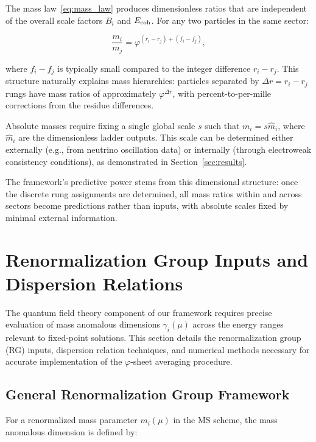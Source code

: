 \documentclass[%
amsmath,amssymb,
aps,
prb,
floatfix,
twocolumn
]{revtex4-2}
\begin{document}
The mass law~\eqref{eq:mass_law} produces dimensionless ratios that are independent of the overall scale factors $B_i$ and $E_{\rm coh}$. For any two particles in the same sector:

\begin{equation}
\frac{m_i}{m_j} = \varphi^{(r_i - r_j) + (f_i - f_j)},
\label{eq:mass_ratio}
\end{equation}

where $f_i - f_j$ is typically small compared to the integer difference $r_i - r_j$. This structure naturally explains mass hierarchies: particles separated by $\Delta r = r_i - r_j$ rungs have mass ratios of approximately $\varphi^{\Delta r}$, with percent-to-per-mille corrections from the residue differences.

Absolute masses require fixing a single global scale $s$ such that $m_i = s \hat{m}_i$, where $\hat{m}_i$ are the dimensionless ladder outputs. This scale can be determined either externally (e.g., from neutrino oscillation data) or internally (through electroweak consistency conditions), as demonstrated in Section~\ref{sec:results}.

The framework's predictive power stems from this dimensional structure: once the discrete rung assignments are determined, all mass ratios within and across sectors become predictions rather than inputs, with absolute scales fixed by minimal external information.

\section{Renormalization Group Inputs and Dispersion Relations}
\label{sec:running}

The quantum field theory component of our framework requires precise evaluation of mass anomalous dimensions $\gamma_i(\mu)$ across the energy ranges relevant to fixed-point solutions. This section details the renormalization group (RG) inputs, dispersion relation techniques, and numerical methods necessary for accurate implementation of the $\varphi$-sheet averaging procedure.

\subsection{General Renormalization Group Framework}
\label{subsec:rg_framework}

For a renormalized mass parameter $m_i(\mu)$ in the $\overline{\text{MS}}$ scheme, the mass anomalous dimension is defined by:
\end{document}
